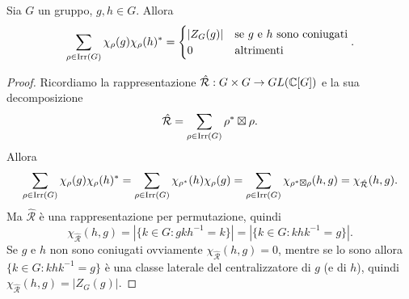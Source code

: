 \begin{proposition}
Sia $G$ un gruppo, $g,h\in G$. Allora
$$
\sum_{\rho\in\operatorname{Irr}(G)}\chi_\rho(g)\chi_\rho(h)^*=
\begin{cases}
|Z_G(g)|&\text{se $g$ e $h$ sono coniugati}\\
0&\text{altrimenti}
\end{cases}.
$$
\end{proposition}
\begin{proof}
Ricordiamo la rappresentazione $\hat{\mathcal{R}}:G\times G\to GL(\mathbb{C}[G])$ e la sua decomposizione
$$
\hat{\mathcal{R}}=\sum_{\rho\in\operatorname{Irr}(G)}\rho^*\boxtimes\rho.
$$
Allora
$$
\sum_{\rho\in\operatorname{Irr}(G)}\chi_\rho(g)\chi_\rho(h)^*=\sum_{\rho\in\operatorname{Irr}(G)}\chi_{\rho^*}(h)\chi_\rho(g)=\sum_{\rho\in\operatorname{Irr}(G)}\chi_{\rho^*\boxtimes\rho}(h,g)=\chi_{\hat{\mathcal{R}}}(h,g).
$$
Ma $\hat{\mathcal{R}}$ è una rappresentazione per permutazione, quindi
$$
\chi_{\hat{\mathcal{R}}}(h,g)=|\{k\in G:gkh^{-1}=k\}|=|\{k\in G:khk^{-1}=g\}|.
$$
Se $g$ e $h$ non sono coniugati ovviamente $\chi_{\hat{\mathcal{R}}}(h,g)=0$, mentre se lo sono allora $\{k\in G:khk^{-1}=g\}$ è una classe laterale del centralizzatore di $g$ (e di $h$), quindi $\chi_{\hat{\mathcal{R}}}(h,g)=|Z_G(g)|$.
\end{proof}





